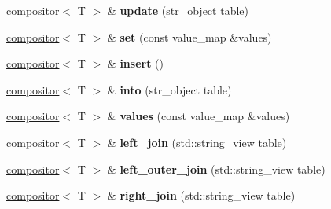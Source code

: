 \begin{DoxyCompactItemize}
\hyperlink{structmods_1_1sql_1_1compositor}{compositor}$<$ T $>$ \& {\bfseries update} (str\+\_\+object table)
\item 
\mbox{\label{structmods_1_1sql_1_1compositor_a82ba6ebe1de553e3b3a453f610577cf5}} 
\hyperlink{structmods_1_1sql_1_1compositor}{compositor}$<$ T $>$ \& {\bfseries set} (const value\+\_\+map \&values)
\item 
\mbox{\label{structmods_1_1sql_1_1compositor_aecc2b200d1fd7087fa245673e1412440}} 
\hyperlink{structmods_1_1sql_1_1compositor}{compositor}$<$ T $>$ \& {\bfseries insert} ()
\item 
\mbox{\label{structmods_1_1sql_1_1compositor_a33648e6b1df1a055c6f1eee309c3c30f}} 
\hyperlink{structmods_1_1sql_1_1compositor}{compositor}$<$ T $>$ \& {\bfseries into} (str\+\_\+object table)
\item 
\mbox{\label{structmods_1_1sql_1_1compositor_aedf3825d0c545eea707bed612abe2861}} 
\hyperlink{structmods_1_1sql_1_1compositor}{compositor}$<$ T $>$ \& {\bfseries values} (const value\+\_\+map \&values)
\item 
\mbox{\label{structmods_1_1sql_1_1compositor_ae6c1bf2283b69a1803acf760ae8a0c94}} 
\hyperlink{structmods_1_1sql_1_1compositor}{compositor}$<$ T $>$ \& {\bfseries left\+\_\+join} (std\+::string\+\_\+view table)
\item 
\mbox{\label{structmods_1_1sql_1_1compositor_a3308e878a89df8262025ad9d748729ed}} 
\hyperlink{structmods_1_1sql_1_1compositor}{compositor}$<$ T $>$ \& {\bfseries left\+\_\+outer\+\_\+join} (std\+::string\+\_\+view table)
\item 
\mbox{\label{structmods_1_1sql_1_1compositor_ade6eac3b1c5ba1208342476672e51361}} 
\hyperlink{structmods_1_1sql_1_1compositor}{compositor}$<$ T $>$ \& {\bfseries right\+\_\+join} (std\+::string\+\_\+view table)
\item 
\mbox{\label{structmods_1_1sql_1_1compositor_a4a899aa7f2320ef0802a7955b8b909c2}} 

\end{DoxyCompactItemize}
